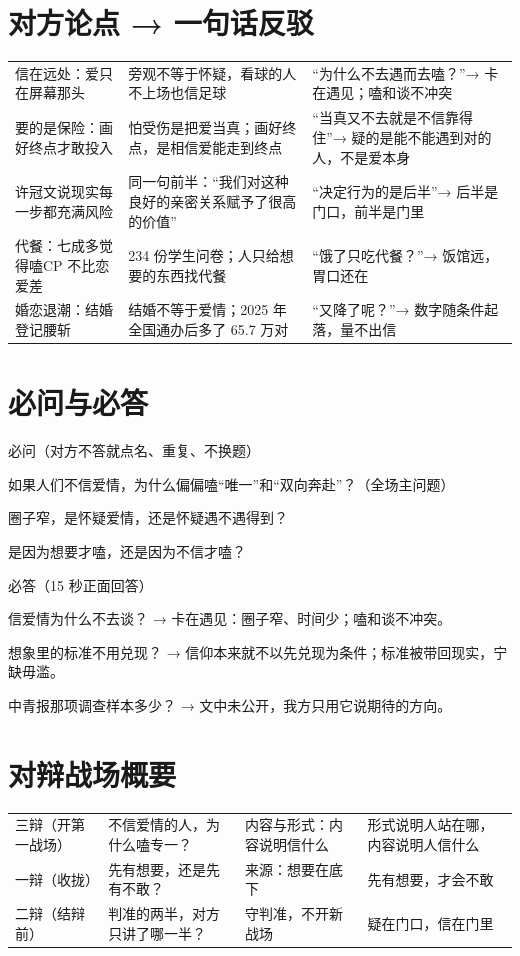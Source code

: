 \documentclass[quick,pro]{debate}
\begin{document}
\section{对方论点 → 一句话反驳}
\begin{tabularx}{\linewidth}{@{}Y Y Y@{}}\toprule
{}&&\\\midrule
信在远处：爱只在屏幕那头&旁观不等于怀疑，看球的人不上场也信足球&“为什么不去遇而去嗑？”→ 卡在遇见；嗑和谈不冲突\\
要的是保险：画好终点才敢投入&怕受伤是把爱当真；画好终点，是相信爱能走到终点&“当真又不去就是不信靠得住”→ 疑的是能不能遇到对的人，不是爱本身\\
许冠文说现实每一步都充满风险&同一句前半：“我们对这种良好的亲密关系赋予了很高的价值”&“决定行为的是后半”→ 后半是门口，前半是门里\\
代餐：七成多觉得嗑CP 不比恋爱差&234 份学生问卷；人只给想要的东西找代餐&“饿了只吃代餐？”→ 饭馆远，胃口还在\\
婚恋退潮：结婚登记腰斩&结婚不等于爱情；2025 年全国通办后多了 65.7 万对&“又降了呢？”→ 数字随条件起落，量不出信\\
\bottomrule\end{tabularx}

\section{必问与必答}
\begin{points}{必问（对方不答就点名、重复、不换题）}
\item 如果人们不信爱情，为什么偏偏嗑“唯一”和“双向奔赴”？（全场主问题）
\item 圈子窄，是怀疑爱情，还是怀疑遇不遇得到？
\item 是因为想要才嗑，还是因为不信才嗑？
\end{points}
\begin{points}{必答（15 秒正面回答）}
\item 信爱情为什么不去谈？ → 卡在遇见：圈子窄、时间少；嗑和谈不冲突。
\item 想象里的标准不用兑现？ → 信仰本来就不以先兑现为条件；标准被带回现实，宁缺毋滥。
\item 中青报那项调查样本多少？ → 文中未公开，我方只用它说期待的方向。
\end{points}

\section{对辩战场概要}
\begin{tabularx}{\linewidth}{@{}L{5.2em}Y Y Y@{}}\toprule
{}&&&\\\midrule
三辩（开第一战场）&不信爱情的人，为什么嗑专一？&内容与形式：内容说明信什么&形式说明人站在哪，内容说明人信什么\\
一辩（收拢）&先有想要，还是先有不敢？&来源：想要在底下&先有想要，才会不敢\\
二辩（结辩前）&判准的两半，对方只讲了哪一半？&守判准，不开新战场&疑在门口，信在门里\\
\bottomrule\end{tabularx}
\end{document}
